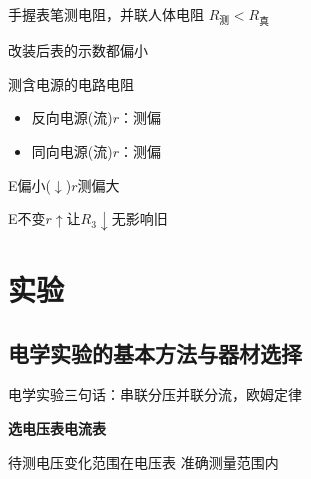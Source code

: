 手握表笔测电阻，并联人体电阻 $R_{\text{测}}<R_{\text{真}}$

改装后表的示数都偏小 %


测含电源的电路电阻
\begin{itemize}
\item 反向电源(流)\quad $r$：测偏 %
\item 同向电源(流)\quad $r$：测偏 %
\end{itemize}
E偏小($\downarrow$)\quad $r$测偏大

E不变\quad $r\uparrow$\quad 让$R_3\downarrow$\quad 无影响\quad 旧 %


\section{实验}
\subsection{电学实验的基本方法与器材选择}
电学实验三句话：串联分压\quad 并联分流，欧姆定律

\textbf{选电压表\quad 电流表}

待测电压变化范围在电压表 准确测量范围内

